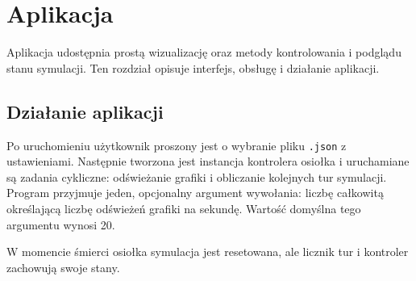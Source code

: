 

\chapter{Aplikacja}
Aplikacja udostępnia prostą wizualizację oraz metody kontrolowania i podglądu stanu symulacji. Ten rozdział opisuje interfejs, obsługę i działanie aplikacji.

\section{Działanie aplikacji}
Po uruchomieniu użytkownik proszony jest o wybranie pliku \texttt{.json} z ustawieniami. Następnie tworzona jest instancja kontrolera osiołka i uruchamiane są zadania cykliczne: odświeżanie grafiki i obliczanie kolejnych tur symulacji. Program przyjmuje jeden, opcjonalny argument wywołania: liczbę całkowitą określającą liczbę odświeżeń grafiki na sekundę. Wartość domyślna tego argumentu wynosi 20.

W momencie śmierci osiołka symulacja jest resetowana, ale licznik tur i kontroler zachowują swoje stany.

\clearpage

